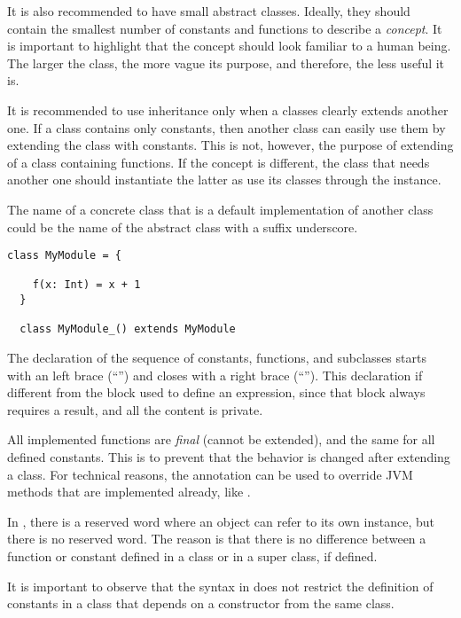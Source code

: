 It is also recommended to have small abstract classes.
Ideally, they should contain the smallest number of constants and functions to describe a \textit{concept}.
It is important to highlight that the concept should look familiar to a human being.
The larger the class, the more vague its purpose, and therefore, the less useful it is.

It is recommended to use inheritance only when a classes clearly extends another one.
If a class contains only constants, then another class can easily use them by extending the class with constants.
This is not, however, the purpose of extending of a class containing functions.
If the concept is different, the class that needs another one should instantiate the latter as use its classes through the instance.

The name of a concrete class that is a default implementation of another class could be the name of the abstract class with a suffix underscore.

\begin{lstlisting}[label={lst:exampleDefaultImplementation}]
  class MyModule = {

    f(x: Int) = x + 1
  }

  class MyModule_() extends MyModule
\end{lstlisting}

The declaration of the sequence of constants, functions, and subclasses starts with an left brace (``\srccode{\{}'') and closes with a right brace (``\srccode{\}}'').
This declaration if different from the block used to define an expression, since that block always requires a result, and all the content is private.

All implemented functions are \textit{final} (cannot be extended), and the same for all defined constants.
This is to prevent that the behavior is changed after extending a class.
For technical reasons, the annotation \soverride can be used to override JVM methods that are implemented already, like .

In \Soda, there is a \sthis reserved word where an object can refer to its own instance, but there is no  reserved word.
The reason is that there is no difference between a function or constant defined in a class or in a super class, if defined.

It is important to observe that the syntax in \Soda does not restrict the definition of constants in a class that depends on a constructor from the same class.

